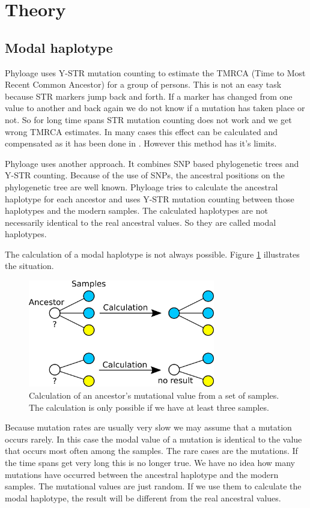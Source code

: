 \section{Theory}

\subsection{Modal haplotype}

Phyloage uses Y-STR mutation counting to estimate the TMRCA
(Time to Most Recent Common Ancestor) for a group of persons.
This is not an easy task because STR markers jump back and
forth. If a marker has changed from one value to another and
back again we do not know if a mutation has taken place or
not. So for long time spans STR mutation counting does not
work and we get wrong TMRCA estimates. In many cases this
effect can be calculated and compensated as it has been done
in \cite{Kly09}. However this method has it's limits.

Phyloage uses another approach. It combines SNP based phylogenetic
trees and Y-STR counting. Because of the use of SNPs, the
ancestral positions on the phylogenetic tree are well known.
Phyloage tries to calculate the ancestral haplotype for each
ancestor and uses Y-STR mutation counting between those
haplotypes and the modern samples. The calculated haplotypes
are not necessarily identical to the real ancestral values.
So they are called modal haplotypes.

The calculation of a modal haplotype is not always possible.
Figure \ref{modal} illustrates the situation.

\begin{figure}[ht]
\centering
\includegraphics[width=8.14cm]{img/modal.png}
\caption{\label{modal} Calculation of an ancestor's mutational
value from a set of samples. The calculation is only possible
if we have at least three samples.}
\end{figure}

Because mutation rates are usually very slow we may assume
that a mutation occurs rarely. In this case the modal value
of a mutation is identical to the value that occurs most
often among the samples. The rare cases are the mutations.
If the time spans get very long this is no longer true. We
have no idea how many mutations have occurred between the
ancestral haplotype and the modern samples. The mutational
values are just random. If we use them to calculate the modal
haplotype, the result will be different from the real ancestral
values.

